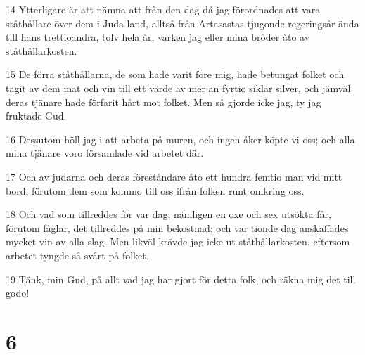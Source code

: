 \par 14 Ytterligare är att nämna att från den dag då jag förordnades att vara ståthållare över dem i Juda land, alltså från Artasastas tjugonde regeringsår ända till hans trettioandra, tolv hela år, varken jag eller mina bröder åto av ståthållarkosten.
\par 15 De förra ståthållarna, de som hade varit före mig, hade betungat folket och tagit av dem mat och vin till ett värde av mer än fyrtio siklar silver, och jämväl deras tjänare hade förfarit hårt mot folket. Men så gjorde icke jag, ty jag fruktade Gud.
\par 16 Dessutom höll jag i att arbeta på muren, och ingen åker köpte vi oss; och alla mina tjänare voro församlade vid arbetet där.
\par 17 Och av judarna och deras föreståndare åto ett hundra femtio man vid mitt bord, förutom dem som kommo till oss ifrån folken runt omkring oss.
\par 18 Och vad som tillreddes för var dag, nämligen en oxe och sex utsökta får, förutom fåglar, det tillreddes på min bekostnad; och var tionde dag anskaffades mycket vin av alla slag. Men likväl krävde jag icke ut ståthållarkosten, eftersom arbetet tyngde så svårt på folket.
\par 19 Tänk, min Gud, på allt vad jag har gjort för detta folk, och räkna mig det till godo!

\chapter{6}

